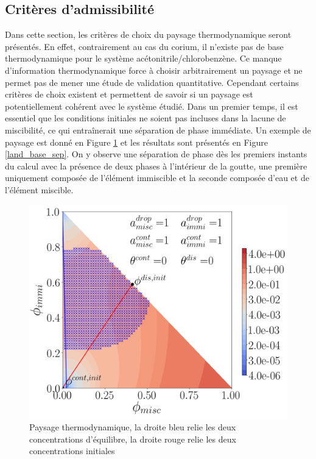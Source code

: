 \subsection{Critères d'admissibilité} \label{subsec:critere_admi}
Dans cette section, les critères de choix du paysage thermodynamique seront présentés. En effet, contrairement au cas du corium, il n'existe pas de base thermodynamique pour le système acétonitrile/chlorobenzène. Ce manque d'information thermodynamique force à choisir arbitrairement un paysage et ne permet pas de mener une étude de validation quantitative. Cependant certains critères de choix existent et permettent de savoir si un paysage est potentiellement cohérent avec le système étudié.
Dans un premier temps, il est essentiel que les conditions initiales ne soient pas incluses dans la lacune de miscibilité, ce qui entraînerait une séparation de phase immédiate. Un exemple de paysage est donné en Figure \ref{fig:landscapebase} et les résultats sont présentés en Figure \ref{land_base_sep}. On y observe une séparation de phase dès les premiers instants du calcul avec la présence de deux phases à l'intérieur de la goutte, une première uniquement composée de l'élément immiscible et la seconde composée d'eau et de l'élément miscible.
 \begin{figure}[H]
 	\centering
 	\includegraphics[width=0.6\linewidth]{figure/landscape_base_chap3.png}
 	\caption[Paysage thermodynamique]{Paysage thermodynamique, la droite bleu relie les deux concentrations d'équilibre, la droite rouge relie les deux concentrations initiales}
 	\label{fig:landscapebase}
 \end{figure}
\vspace{-0.5cm}
